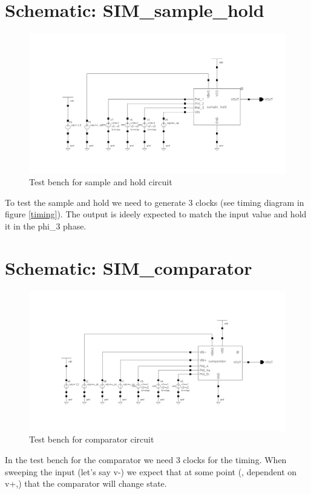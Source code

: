 \documentclass[english, a4paper,11pt]{article}
\begin{document}
\section*{Schematic: SIM\_sample\_hold}
\begin{figure}[!ht]
 \centering
   \includegraphics[width=\textwidth]{img/SIM_sample_hold.png}
   \caption{Test bench for sample and hold circuit}
   \label{sim:sh}
\end{figure}
To test the sample and hold we need to generate 3 clocks (see timing diagram in figure \ref{timing}). 
The output is ideely expected to match the input value and hold it in the phi\_3 phase.


\section*{Schematic: SIM\_comparator}
\begin{figure}[!ht]
 \centering
   \includegraphics[width=\textwidth]{img/SIM_comparator.png}
   \caption{Test bench for comparator circuit}
   \label{sim:comparator}
\end{figure}
In the test bench for the comparator we need 3 clocks for the timing. 
When sweeping the input (let's say v-) we expect that at some point (, dependent on v+,) that the comparator will change state. 
\end{document}
